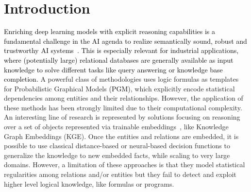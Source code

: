 \documentclass[journal]{IEEEtran}
\newcommand{\ar}[1]{\textcolor{black}{#1}}
\begin{document}

\IEEEpeerreviewmaketitle





\section{Introduction}
\label{sec:introduction}
\ar{Enriching deep learning models with explicit reasoning capabilities is a fundamental challenge in the AI agenda to realize semantically sound, robust and trustworthy AI systems~\cite{hitzler2022neuro,garcez2020neurosymbolic,marcus2020next,de2020statistical}. This is especially relevant for industrial applications, where (potentially large) relational databases are generally available as input knowledge to solve different tasks like query answering or knowledge base completion.} 
A powerful class of methodologies \cite{raedt2016statistical} uses logic formulas as templates for Probabilistic Graphical Models \ar{(PGM)}, which explicitly encode statistical dependencies among entities and their relationships. However, the application of these methods has been strongly limited due to their computational complexity. %
An interesting line of research is represented by solutions focusing
on reasoning over a set of objects represented via trainable embeddings~\cite{wang2017knowledge}, like Knowledge Graph Embeddings (KGE). Once the entities and relations are embedded, it is possible to use classical distance-based or neural-based decision functions to generalize the knowledge to new embedded facts, while scaling to very large domains.
However, a limitation of these approaches is that they model statistical regularities among relations and/or entities but they fail to detect and exploit higher level logical knowledge, like formulas or programs. %
\end{document}
